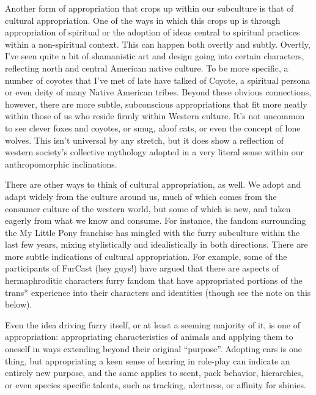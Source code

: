Another form of appropriation that crops up within our subculture is that of cultural appropriation. One of the ways in which this crops up is through appropriation of spiritual or the adoption of ideas central to spiritual practices within a non-spiritual context. This can happen both overtly and subtly. Overtly, I've seen quite a bit of shamanistic art and design going into certain characters, reflecting north and central American native culture. To be more specific, a number of coyotes that I've met of late have talked of Coyote, a spiritual persona or even deity of many Native American tribes. Beyond these obvious connections, however, there are more subtle, subconscious appropriations that fit more neatly within those of us who reside firmly within Western culture. It's not uncommon to see clever foxes and coyotes, or smug, aloof cats, or even the concept of lone wolves. This isn't universal by any stretch, but it does show a reflection of western society's collective mythology adopted in a very literal sense within our anthropomorphic inclinations.

There are other ways to think of cultural appropriation, as well. We adopt and adapt widely from the culture around us, much of which comes from the consumer culture of the western world, but some of which is new, and taken eagerly from what we know and consume. For instance, the fandom surrounding the My Little Pony franchise has mingled with the furry subculture within the last few years, mixing stylistically and idealistically in both directions. There are more subtle indications of cultural appropriation.  For example, some of the participants of FurCast (hey guys!) have argued that there are aspects of hermaphroditic characters furry fandom that have appropriated portions of the trans* experience into their characters and identities (though see the note on this below).

Even the idea driving furry itself, or at least a seeming majority of it, is one of appropriation: appropriating characteristics of animals and applying them to oneself in ways extending beyond their original ``purpose''. Adopting ears is one thing, but appropriating a keen sense of hearing in role-play can indicate an entirely new purpose, and the same applies to scent, pack behavior, hierarchies, or even species specific talents, such as tracking, alertness, or affinity for shinies.

